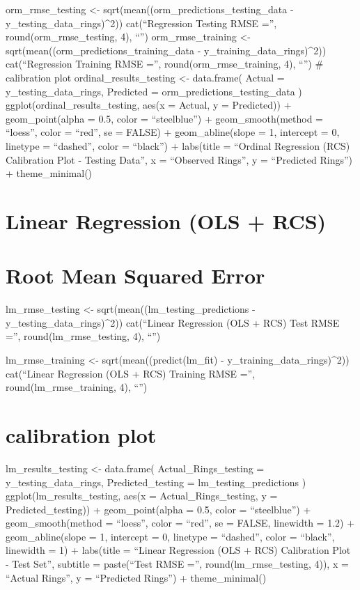 \documentclass[
  letterpaper,
  DIV=11,
  numbers=noendperiod]{scrreprt}
\begin{document}
{orm\_rmse\_testing \textless- sqrt(mean((orm\_predictions\_testing\_data
- y\_testing\_data\_rings)\^{}2)) cat(``\nOrdinal Regression Testing
RMSE ='', round(orm\_rmse\_testing, 4), ``\n'') orm\_rmse\_training
\textless- sqrt(mean((orm\_predictions\_training\_data -
y\_training\_data\_rings)\^{}2)) cat(``\nOrdinal Regression Training
RMSE ='', round(orm\_rmse\_training, 4), ``\n'') \# calibration plot
ordinal\_results\_testing \textless- data.frame( Actual =
y\_testing\_data\_rings, Predicted = orm\_predictions\_testing\_data )
ggplot(ordinal\_results\_testing, aes(x = Actual, y = Predicted)) +
geom\_point(alpha = 0.5, color = ``steelblue'') + geom\_smooth(method =
``loess'', color = ``red'', se = FALSE) + geom\_abline(slope = 1,
intercept = 0, linetype = ``dashed'', color = ``black'') + labs(title =
``Ordinal Regression (RCS) Calibration Plot - Testing Data'', x =
``Observed Rings'', y = ``Predicted Rings'') + theme\_minimal()


\chapter{Linear Regression (OLS + RCS)}\label{linear-regression-ols-rcs}


\chapter{Root Mean Squared Error}\label{root-mean-squared-error-1}

lm\_rmse\_testing \textless- sqrt(mean((lm\_testing\_predictions -
y\_testing\_data\_rings)\^{}2)) cat(``Linear Regression (OLS + RCS) Test
RMSE ='', round(lm\_rmse\_testing, 4), ``\n'')

lm\_rmse\_training \textless- sqrt(mean((predict(lm\_fit) -
y\_training\_data\_rings)\^{}2)) cat(``Linear Regression (OLS + RCS)
Training RMSE ='', round(lm\_rmse\_training, 4), ``\n'')


\chapter{calibration plot}\label{calibration-plot}

lm\_results\_testing \textless- data.frame( Actual\_Rings\_testing =
y\_testing\_data\_rings, Predicted\_testing = lm\_testing\_predictions )
ggplot(lm\_results\_testing, aes(x = Actual\_Rings\_testing, y =
Predicted\_testing)) + geom\_point(alpha = 0.5, color = ``steelblue'') +
geom\_smooth(method = ``loess'', color = ``red'', se = FALSE, linewidth
= 1.2) + geom\_abline(slope = 1, intercept = 0, linetype = ``dashed'',
color = ``black'', linewidth = 1) + labs(title = ``Linear Regression
(OLS + RCS) Calibration Plot - Test Set'', subtitle = paste(``Test RMSE
='', round(lm\_rmse\_testing, 4)), x = ``Actual Rings'', y = ``Predicted
Rings'') + theme\_minimal()

}
\end{document}
